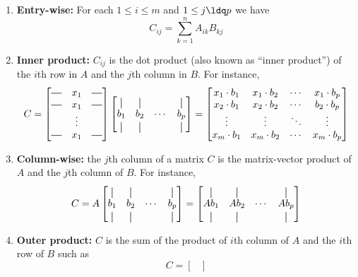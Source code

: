 \documentclass[11pt]{article}
\newcommand*{\vertbar}{\rule[-1ex]{0.5pt}{2.5ex}}
\newcommand*{\horzbar}{\rule[.5ex]{2.5ex}{0.5pt}}
\begin{document}
\begin{itemize}
	\begin{enumerate}
		\item \textbf{Entry-wise:} For each $1 \leq i \leq m$ and $1 \leq j \ldq p$ we have
			$$C_{ij}= \sum_{k=1}^{n} A_{ik}B_{kj}$$
		\item \textbf{Inner product:} $C_{ij}$ is the dot product (also known as ``inner product'') of the $i$th row in $A$ and the $j$th column in $B$. For instance,
			$$C = \begin{bmatrix}
			  \horzbar & x_{1} & \horzbar\\
			  \horzbar & x_{1} & \horzbar\\
					   & \vdots & \\
			  \horzbar & x_{1} & \horzbar
			\end{bmatrix} \begin{bmatrix}
			  \vertbar & \vertbar & &\vertbar \\
			  b_{1} & b_{2} & \cdots & b_{p} \\
			  \vertbar & \vertbar & &\vertbar 
			\end{bmatrix} = \begin{bmatrix}
			  x_{1} \cdot b_{1} & x_{1} \cdot b_{2} & \cdots  & x_{1} \cdot b_{p}\\
			x_{2} \cdot b_{1} & x_{2}\cdot b_{2} & \cdots & b_{2} \cdot b_{p}\\
			\vdots & \vdots & \ddots & \vdots\\
			x_{m}\cdot b_{1} & x_{m} \cdot b_{2} & \cdots & x_{m} \cdot b_{p}
			\end{bmatrix}$$
		\item \textbf{Column-wise: }the $j$th column of a matrix $C$ is the matrix-vector product of $A$ and the $j$th column of $B$. For instance,
			$$C = A \begin{bmatrix}
			  \vertbar & \vertbar &  & \vertbar\\
			b_{1} & b_{2} & \cdots & b_{p}\\
			  \vertbar & \vertbar &  & \vertbar
			\end{bmatrix} = \begin{bmatrix}   
			  \vertbar & \vertbar &  & \vertbar\\
			Ab_{1} & Ab_{2} & \cdots & Ab_{p}\\
			  \vertbar & \vertbar &  & \vertbar
			\end{bmatrix}$$
		\item \textbf{Outer product:} $C$ is the sum of the product of $i$th column of $A$ and the $i$th row of $B$ such as
			$$C=\begin{bmatrix}

\end{bmatrix}$$
\end{enumerate}
\end{itemize}
\end{document}

